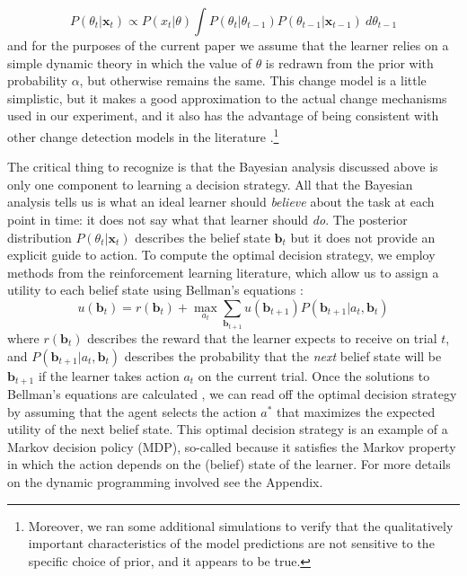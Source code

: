 \documentclass[authoryear]{elsarticle}
\begin{document}
\begin{equation}
P( \theta_t | \bm{x}_t) \propto P(x_t | \theta) \int P(\theta_t | \theta_{t-1})  P(\theta_{t-1} | \bm{x}_{t-1}) \ d\theta_{t-1}
\end{equation}
and for the purposes of the current paper we assume that the learner relies on a simple dynamic theory in which the value of $\theta$ is redrawn from the prior with probability $\alpha$, but otherwise remains the same. This change model is a little  simplistic, but it makes a good approximation to the actual change mechanisms used in our experiment, and it also has the advantage of being consistent with other change detection models in the literature \citep[e.g.,][]{cohen_should_2007,yu_sequential_2008,brown_detecting_2009}.\footnote{Moreover, we ran some additional simulations to verify that the qualitatively important characteristics of the model predictions are not sensitive to the specific choice of prior, and it appears to be true.}

The critical thing to recognize is that the Bayesian analysis discussed above is only one component to learning a decision strategy. All that the Bayesian analysis tells us is what an ideal learner should {\it believe} about the task at each point in time: it does not say what that learner should {\it do}. The posterior distribution $P(\theta_t | \bm{x}_t)$ describes the belief state $\bm{b}_t$ but it does not provide an explicit guide to action. To compute the optimal decision strategy, we employ methods from the reinforcement learning literature, which allow us to assign a utility to each belief state using Bellman's equations \citep[see][]{bellman_markovian_1957,kaelbling_reinforcement_1996}:
\begin{equation}
u(\bm{b}_t) = r(\bm{b}_t) + \max_{a_t} \sum_{\bm{b}_{t+1}} u(\bm{b}_{t+1}) P(\bm{b}_{t+1} | a_t, \bm{b}_{t})
\end{equation}
where $r(\bm{b}_t)$ describes the reward that the learner expects to receive on trial $t$, and $P(\bm{b}_{t+1} | a_t, \bm{b}_{t})$ describes the probability that the {\it next} belief state will be $\bm{b}_{t+1}$ if the learner takes action $a_t$ on the current trial. Once the solutions to Bellman's equations are calculated \citep[via dynamic programming methods such as the value iteration algorithm; e.g.,][]{kaelbling_reinforcement_1996}, we can read off the optimal decision strategy by assuming that the agent selects the action $a^*$ that maximizes the expected utility of the next belief state. This optimal decision strategy is an example of a Markov decision policy (MDP), so-called because it satisfies the Markov property in which the action depends on the (belief) state of the learner. For more details on the dynamic programming involved see the Appendix.
\end{document}
